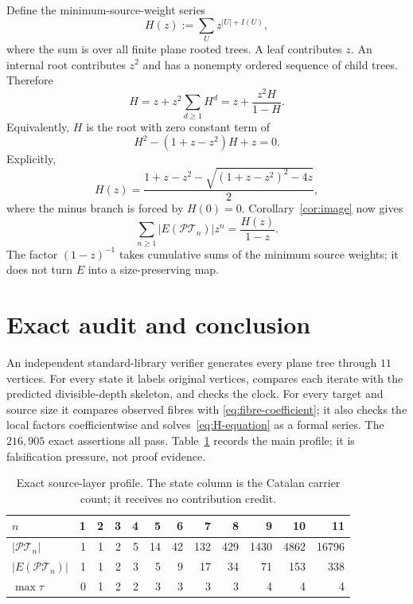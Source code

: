 \documentclass[a4paper,10pt]{amsart}
\theoremstyle{definition}
\theoremstyle{remark}
\newcommand{\PT}{\mathcal{PT}}
\begin{document}
Define the minimum-source-weight series
\begin{equation}\label{eq:H-def}
                    H(z):=\sum_Uz^{|U|+I(U)},
\end{equation}
where the sum is over all finite plane rooted trees.  A leaf contributes $z$.
An internal root contributes $z^2$ and has a nonempty ordered sequence of
child trees.  Therefore
\begin{equation}\label{eq:H-equation}
          H=z+z^2\sum_{d\ge1}H^d
           =z+\frac{z^2H}{1-H}.
\end{equation}
Equivalently, $H$ is the root with zero constant term of
\[
             H^2-(1+z-z^2)H+z=0.
\]
Explicitly,
\begin{equation}\label{eq:H-closed}
 H(z)=\frac{1+z-z^2-
 \sqrt{(1+z-z^2)^2-4z}}{2},
\end{equation}
where the minus branch is forced by $H(0)=0$.
Corollary~\ref{cor:image} now gives
\begin{equation}\label{eq:image-gf}
 \sum_{n\ge1}|E(\PT_n)|z^n=\frac{H(z)}{1-z}.
\end{equation}
The factor $(1-z)^{-1}$ takes cumulative sums of the minimum source weights;
it does not turn $E$ into a size-preserving map.

\section{Exact audit and conclusion}

An independent standard-library verifier generates every plane tree through
$11$ vertices.  For every state it labels original vertices, compares each
iterate with the predicted divisible-depth skeleton, and checks the clock.
For every target and source size it compares observed fibres with
\eqref{eq:fibre-coefficient}; it also checks the local factors
coefficientwise and solves~\eqref{eq:H-equation} as a formal series.  The
$216{,}905$ exact assertions all pass.  Table~\ref{tab:audit} records the
main profile; it is falsification pressure, not proof evidence.

\begin{table}[ht]
\centering
\small
\caption{Exact source-layer profile.  The state column is the Catalan carrier
count; it receives no contribution credit.}
\label{tab:audit}
\begin{tabular}{@{}l*{11}{r}@{}}
\toprule
$n$&1&2&3&4&5&6&7&8&9&10&11\\
\midrule
$|\PT_n|$&1&1&2&5&14&42&132&429&1430&4862&16796\\
$|E(\PT_n)|$&1&1&2&3&5&9&17&34&71&153&338\\
$\max\tau$&0&1&2&2&3&3&3&3&4&4&4\\
\bottomrule
\end{tabular}
\end{table}
\end{document}
